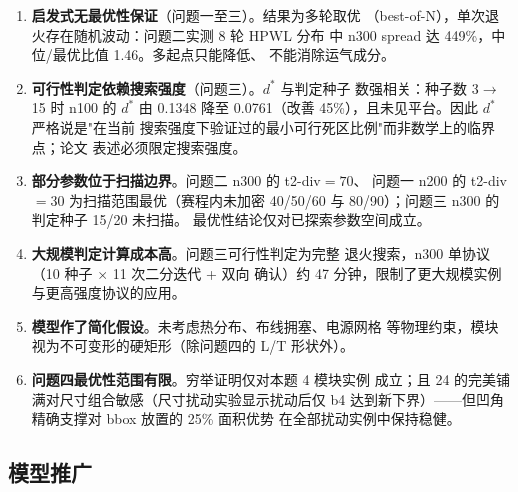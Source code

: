 \documentclass[12pt,a4paper]{article}
\begin{document}
\begin{enumerate}[leftmargin=2em]
    \item \textbf{启发式无最优性保证}（问题一至三）。结果为多轮取优
    （best-of-N），单次退火存在随机波动：问题二实测 8 轮 HPWL 分布
    中 n300 spread 达 449\%，中位/最优比值 1.46。多起点只能降低、
    不能消除运气成分。

    \item \textbf{可行性判定依赖搜索强度}（问题三）。$d^*$ 与判定种子
    数强相关：种子数 3$\to$15 时 n100 的 $d^*$ 由 0.1348 降至
    0.0761（改善 45\%），且未见平台。因此 $d^*$ 严格说是"在当前
    搜索强度下验证过的最小可行死区比例"而非数学上的临界点；论文
    表述必须限定搜索强度。

    \item \textbf{部分参数位于扫描边界}。问题二 n300 的 t2-div$=70$、
    问题一 n200 的 t2-div$=30$ 为扫描范围最优（赛程内未加密
    40/50/60 与 80/90）；问题三 n300 的判定种子 15/20 未扫描。
    最优性结论仅对已探索参数空间成立。

    \item \textbf{大规模判定计算成本高}。问题三可行性判定为完整
    退火搜索，n300 单协议（10 种子 $\times$ 11 次二分迭代 + 双向
    确认）约 47 分钟，限制了更大规模实例与更高强度协议的应用。

    \item \textbf{模型作了简化假设}。未考虑热分布、布线拥塞、电源网格
    等物理约束，模块视为不可变形的硬矩形（除问题四的 L/T 形状外）。

    \item \textbf{问题四最优性范围有限}。穷举证明仅对本题 4 模块实例
    成立；且 24 的完美铺满对尺寸组合敏感（尺寸扰动实验显示扰动后仅
    b4 达到新下界）——但凹角精确支撑对 bbox 放置的 25\% 面积优势
    在全部扰动实例中保持稳健。
\end{enumerate}

\subsection{模型推广}
\end{document}
